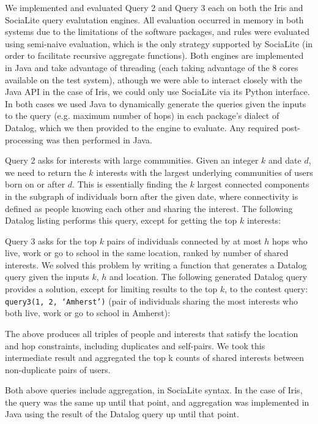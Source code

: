 \documentclass{article}
\begin{document}
\begin{multicols}{2}
We implemented and evaluated Query 2 and Query 3 each on both the Iris and SociaLite query evalutation engines. All evaluation occurred in memory in both systems due to the limitations of the software packages, and rules were evaluated using semi-naive evaluation, which is the only strategy supported by SociaLite (in order to facilitate recursive aggregate functions). Both engines are implemented in Java and take advantage of threading (each taking advantage of the 8 cores available on the test system), athough we were able to interact closely with the Java API in the case of Iris, we could only use SociaLite via its Python interface. In both cases we used Java to dynamically generate the queries given the inputs to the query (e.g. maximum number of hops) in each package's dialect of Datalog, which we then provided to the engine to evaluate. Any required post-processing was then performed in Java.

Query 2 asks for interests with large communities. Given an integer $k$ and date $d$, we need to return the $k$ interests with the largest underlying communities of users born on or after $d$. This is essentially finding the $k$ largest connected components in the subgraph of individuals born after the given date, where connectivity is defined as people knowing each other and sharing the interest. The following Datalog listing performs this query, except for getting the top $k$ interests:



Query 3 asks for the top $k$ pairs of individuals connected by at most $h$ hops who live, work or go to school in the same location, ranked by number of shared interests. We solved this problem by writing a function that generates a Datalog query given the inputs $k$, $h$ and location. The following generated Datalog query provides a solution, except for limiting results to the top $k$, to the contest query: \texttt{query3(1, 2, ‘Amherst’)} (pair of individuals sharing the most interests who both live, work or go to school in Amherst):



The above produces all triples of people and interests that satisfy the location and hop constraints, including duplicates and self-pairs. We took this intermediate result and aggregated the top k counts of shared interests between non-duplicate pairs of users.

Both above queries include aggregation, in SociaLite syntax. In the case of Iris, the query was the same up until that point, and aggregation was implemented in Java using the result of the Datalog query up until that point.																																									

\end{multicols}
\end{document}
